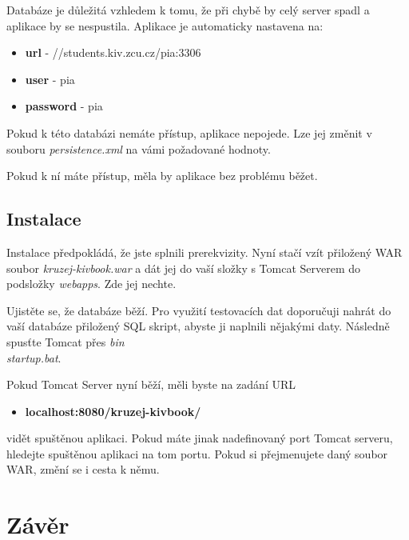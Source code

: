 \documentclass[
12pt,
a4paper,
pdftex,
czech,
titlepage
]{report}
\begin{document}
Databáze je důležitá vzhledem k tomu, že při chybě by celý server spadl a aplikace by se nespustila. Aplikace je automaticky nastavena na:

\begin{itemize}
\item \textbf{url} - //students.kiv.zcu.cz/pia:3306
\item \textbf{user} - pia
\item \textbf{password} - pia
\end{itemize}

Pokud k této databázi nemáte přístup, aplikace nepojede. Lze jej změnit v souboru \textit{persistence.xml} na vámi požadované hodnoty.

Pokud k ní máte přístup, měla by aplikace bez problému běžet.

\section{Instalace}

Instalace předpokládá, že jste splnili prerekvizity. Nyní stačí vzít přiložený WAR soubor \textit{kruzej-kivbook.war} a dát jej do vaší složky s Tomcat Serverem do podsložky \textit{webapps}. Zde jej nechte.

Ujistěte se, že databáze běží. Pro využití testovacích dat doporučuji nahrát do vaší databáze přiložený SQL skript, abyste ji naplnili nějakými daty. Následně spusťte Tomcat přes \textit{bin\\startup.bat}. 

Pokud Tomcat Server nyní běží, měli byste na zadání URL 
\begin{itemize}
\item \textbf{localhost:8080/kruzej-kivbook/}
\end{itemize}
vidět spuštěnou aplikaci. Pokud máte jinak nadefinovaný port Tomcat serveru, hledejte spuštěnou aplikaci na tom portu. Pokud si přejmenujete daný soubor WAR, změní se i cesta k němu.


\chapter{Závěr}
\end{document}
